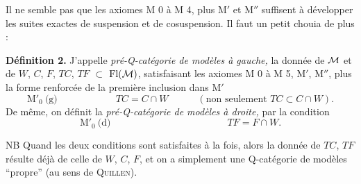 Il ne semble pas que les axiomes M 0 à M 4, plus M$'$ et M$''$ suffisent à développer les suites exactes de suspension et de cosuspension. Il faut un petit chouia de plus :

\textbf{Définition 2.} J'appelle \textit{pré-Q-catégorie de modèles à gauche,} la donnée de $\mathcal{M}$ et de $W$, $C$, $F$, $TC$, $TF$ $\subset$ $\mathrm{Fl}(\mathcal{M})$, satisfaisant les axiomes M 0 à M 5, M$'$, M$''$, plus la forme renforcée de la première inclusion dans M$'$
\[
\text{M}'_0\ \text{(g)}\qquad\qquad\qquad TC=C\cap W\qquad\quad(\text{non seulement } TC\subset C\cap W).
\]
De même, on définit la \textit{pré-Q-catégorie de modèles à droite,} par la condition
\[
\text{M}'_0\ \text{(d)}\qquad\qquad\qquad\qquad\qquad\qquad TF=F\cap W.
\]

NB Quand les deux conditions sont satisfaites à la fois, alors la donnée de $TC$, $TF$ résulte déjà de celle de $W$, $C$, $F$, et on a simplement une Q-catégorie de modèles “propre” (au sens de \textsc{Quillen}).


